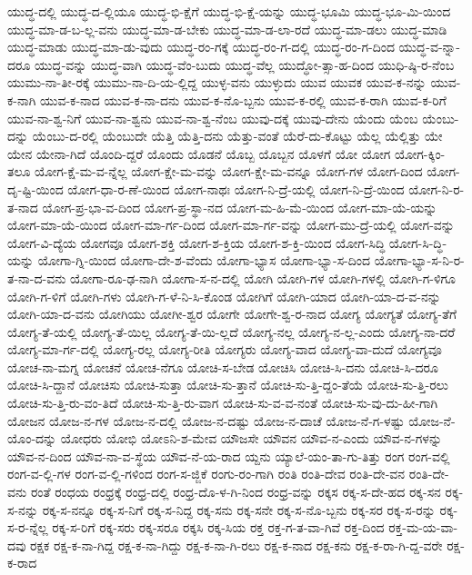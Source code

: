 {ಯುದ್ಧ-ದಲ್ಲಿ
ಯುದ್ಧ-ದ-ಲ್ಲಿಯೂ
ಯುದ್ಧ-ಭಿ-ಕ್ಷೆಗೆ
ಯುದ್ಧ-ಭಿ-ಕ್ಷೆ-ಯನ್ನು
ಯುದ್ಧ-ಭೂಮಿ
ಯುದ್ಧ-ಭೂ-ಮಿ-ಯಿಂದ
ಯುದ್ಧ-ಮಾ-ಡ-ಬ-ಲ್ಲ-ವನು
ಯುದ್ಧ-ಮಾ-ಡ-ಬೇಕು
ಯುದ್ಧ-ಮಾ-ಡ-ಲಾ-ರದೆ
ಯುದ್ಧ-ಮಾ-ಡಲು
ಯುದ್ಧ-ಮಾಡಿ
ಯುದ್ಧ-ಮಾಡು
ಯುದ್ಧ-ಮಾ-ಡು-ವುದು
ಯುದ್ಧ-ರಂ-ಗಕ್ಕೆ
ಯುದ್ಧ-ರಂ-ಗ-ದಲ್ಲಿ
ಯುದ್ಧ-ರಂ-ಗ-ದಿಂದ
ಯುದ್ಧ-ವ-ನ್ನಾ-ದರೂ
ಯುದ್ಧ-ವನ್ನು
ಯುದ್ಧ-ವಾಗಿ
ಯುದ್ಧ-ವೆಂ-ಬುದು
ಯುದ್ಧ-ವೆಲ್ಲ
ಯುದ್ಧೋ-ತ್ಸಾ-ಹ-ದಿಂದ
ಯುಧಿ-ಷ್ಠಿ-ರ-ನೆಂಬ
ಯುಮು-ನಾ-ತೀ-ರಕ್ಕೆ
ಯುಮು-ನಾ-ದಿ-ಯ-ಲ್ಲಿದ್ದ
ಯುಳ್ಳ-ವನು
ಯುಳ್ಳುದು
ಯುವ
ಯುವಕ
ಯುವ-ಕ-ನನ್ನು
ಯುವ-ಕ-ನಾಗಿ
ಯುವ-ಕ-ನಾದ
ಯುವ-ಕ-ನಾ-ದನು
ಯುವ-ಕ-ನೊ-ಬ್ಬನು
ಯುವ-ಕ-ರಲ್ಲಿ
ಯುವ-ಕ-ರಾಗಿ
ಯುವ-ಕ-ರಿಗೆ
ಯುವ-ನಾ-ಶ್ವ-ನಿಗೆ
ಯುವ-ನಾ-ಶ್ವನು
ಯುವ-ನಾ-ಶ್ವ-ನೆಂಬ
ಯುವು-ದಕ್ಕೆ
ಯುವು-ದೇನು
ಯೆಂದು
ಯೆಂಬ
ಯೆಂಬು-ದನ್ನು
ಯೆಂಬು-ದ-ರಲ್ಲಿ
ಯೆಂಬುದೇ
ಯೆತ್ತಿ
ಯೆತ್ತಿ-ದನು
ಯೆತ್ತು-ವಂತೆ
ಯೆರೆ-ದು-ಕೊಟ್ಟು
ಯೆಲ್ಲ
ಯೆಲ್ಲಿತ್ತು
ಯೇ
ಯೇನ
ಯೇನಾ-ಗಿದೆ
ಯೊಂದಿ-ದ್ದರೆ
ಯೊಂದು
ಯೊಡನೆ
ಯೊಬ್ಬ
ಯೊಬ್ಬನ
ಯೊಳಗೆ
ಯೋ
ಯೋಗ
ಯೋಗ-ಕ್ಕಿಂ-ತಲೂ
ಯೋಗ-ಕ್ಷೆ-ಮ-ವ-ನ್ನೆಲ್ಲ
ಯೋಗ-ಕ್ಷೇ-ಮ-ವನ್ನು
ಯೋಗ-ಕ್ಷೇ-ಮ-ವನ್ನೂ
ಯೋಗ-ಗಳ
ಯೋಗ-ದಿಂದ
ಯೋಗ-ದೃ-ಷ್ಟಿ-ಯಿಂದ
ಯೋಗ-ಧಾ-ರ-ಣೆ-ಯಿಂದ
ಯೋಗ-ನಾಥಃ
ಯೋಗ-ನಿ-ದ್ರೆ-ಯಲ್ಲಿ
ಯೋಗ-ನಿ-ದ್ರೆ-ಯಿಂದ
ಯೋಗ-ನಿ-ರ-ತ-ನಾದ
ಯೋಗ-ಪ್ರ-ಭಾ-ವ-ದಿಂದ
ಯೋಗ-ಪ್ರ-ಸ್ಥಾ-ನದ
ಯೋಗ-ಮ-ಹಿ-ಮೆ-ಯಿಂದ
ಯೋಗ-ಮಾ-ಯೆ-ಯನ್ನು
ಯೋಗ-ಮಾ-ಯೆ-ಯಿಂದ
ಯೋಗ-ಮಾ-ರ್ಗ-ದಿಂದ
ಯೋಗ-ಮಾ-ರ್ಗ-ವನ್ನು
ಯೋಗ-ಮು-ದ್ರೆ-ಯಲ್ಲಿ
ಯೋಗ-ವನ್ನು
ಯೋಗ-ವಿ-ದ್ಯೆಯ
ಯೋಗವೂ
ಯೋಗ-ಶಕ್ತಿ
ಯೋಗ-ಶ-ಕ್ತಿಯ
ಯೋಗ-ಶ-ಕ್ತಿ-ಯಿಂದ
ಯೋಗ-ಸಿದ್ಧಿ
ಯೋಗ-ಸಿ-ದ್ಧಿ-ಯನ್ನು
ಯೋಗಾ-ಗ್ನಿ-ಯಿಂದ
ಯೋಗಾ-ದೇ-ಶ-ವೆಂದು
ಯೋಗಾ-ಭ್ಯಾಸ
ಯೋಗಾ-ಭ್ಯಾ-ಸ-ದಿಂದ
ಯೋಗಾ-ಭ್ಯಾ-ಸ-ನಿ-ರ-ತ-ನಾ-ದ-ವನು
ಯೋಗಾ-ರೂ-ಢ-ನಾಗಿ
ಯೋಗಾ-ಸ-ನ-ದಲ್ಲಿ
ಯೋಗಿ
ಯೋಗಿ-ಗಳ
ಯೋಗಿ-ಗಳಲ್ಲಿ
ಯೋಗಿ-ಗ-ಳಿಗೂ
ಯೋಗಿ-ಗ-ಳಿಗೆ
ಯೋಗಿ-ಗಳು
ಯೋಗಿ-ಗ-ಳೆ-ನಿ-ಸಿ-ಕೊಂಡ
ಯೋಗಿಗೆ
ಯೋಗಿ-ಯಾದ
ಯೋಗಿ-ಯಾ-ದ-ವ-ನನ್ನು
ಯೋಗಿ-ಯಾ-ದ-ವನು
ಯೋಗಿಯು
ಯೋಗೀ-ಶ್ವರ
ಯೋಗೇ
ಯೋಗೇ-ಶ್ವ-ರ-ನಾದ
ಯೋಗ್ಯ
ಯೋಗ್ಯತೆ
ಯೋಗ್ಯ-ತೆಗೆ
ಯೋಗ್ಯ-ತೆ-ಯಲ್ಲಿ
ಯೋಗ್ಯ-ತೆ-ಯಿಲ್ಲ
ಯೋಗ್ಯ-ತೆ-ಯಿ-ಲ್ಲದೆ
ಯೋಗ್ಯ-ನಲ್ಲ
ಯೋಗ್ಯ-ನ-ಲ್ಲ-ಎಂದು
ಯೋಗ್ಯ-ನಾ-ದರೆ
ಯೋಗ್ಯ-ಮಾ-ರ್ಗ-ದಲ್ಲಿ
ಯೋಗ್ಯ-ರಲ್ಲ
ಯೋಗ್ಯ-ರೀತಿ
ಯೋಗ್ಯರು
ಯೋಗ್ಯ-ವಾದ
ಯೋಗ್ಯ-ವಾ-ದುದೆ
ಯೋಗ್ಯವೂ
ಯೋಚ-ನಾ-ಮಗ್ನ
ಯೋಚನೆ
ಯೋಚ-ನೆಗೂ
ಯೋಚಿ-ಸ-ಬೇಡ
ಯೋಚಿಸಿ
ಯೋಚಿ-ಸಿ-ದನು
ಯೋಚಿ-ಸಿ-ದರೂ
ಯೋಚಿ-ಸಿ-ದ್ದಾನೆ
ಯೋಚಿಸು
ಯೋಚಿ-ಸುತ್ತಾ
ಯೋಚಿ-ಸು-ತ್ತಾನೆ
ಯೋಚಿ-ಸು-ತ್ತಿ-ದ್ದಂ-ತೆಯೆ
ಯೋಚಿ-ಸು-ತ್ತಿ-ರಲು
ಯೋಚಿ-ಸು-ತ್ತಿ-ರು-ವಂ-ತಿದೆ
ಯೋಚಿ-ಸು-ತ್ತಿ-ರು-ವಾಗ
ಯೋಚಿ-ಸು-ವ-ವ-ನಂತೆ
ಯೋಚಿ-ಸು-ವು-ದು-ಹೀ-ಗಾಗಿ
ಯೋಜನ
ಯೋಜ-ನ-ಗಳ
ಯೋಜ-ನ-ದಲ್ಲಿ
ಯೋಜ-ನ-ದಷ್ಟು
ಯೋಜ-ನ-ದಾಚೆ
ಯೋಜ-ನೆ-ಗ-ಳಷ್ಟು
ಯೋಜ-ನೆ-ಯೊಂ-ದನ್ನು
ಯೋಧರು
ಯೋಭಿ
ಯೋಽನಿ-ಶ-ಮೇವ
ಯೌಜಸೇ
ಯೌವನ
ಯೌವ-ನ-ಎಂದು
ಯೌವ-ನ-ಗಳನ್ನು
ಯೌವ-ನ-ದಿಂದ
ಯೌವ-ನಾ-ವ-ಸ್ಥೆಯ
ಯೌವ-ನೆ-ಯ-ರಾದ
ಯ್ದನು
ಯ್ಯಾಲೆ-ಯಂ-ತಾ-ಗು-ತಿತ್ತು
ರಂಗ
ರಂಗ-ವಲ್ಲಿ
ರಂಗ-ವ-ಲ್ಲಿ-ಗಳ
ರಂಗ-ವ-ಲ್ಲಿ-ಗಳಿಂದ
ರಂಗ-ಸ-ಜ್ಜಿಕೆ
ರಂಗು-ರಂ-ಗಾಗಿ
ರಂತಿ
ರಂತಿ-ದೇವ
ರಂತಿ-ದೇ-ವನ
ರಂತಿ-ದೇ-ವನು
ರಂತೆ
ರಂಧಯ
ರಂಧ್ರಕ್ಕೆ
ರಂಧ್ರ-ದಲ್ಲಿ
ರಂಧ್ರ-ದೊ-ಳ-ಗಿ-ನಿಂದ
ರಂಧ್ರ-ವನ್ನು
ರಕ್ಕಸ
ರಕ್ಕ-ಸ-ದೇ-ಹದ
ರಕ್ಕ-ಸನ
ರಕ್ಕ-ಸ-ನನ್ನು
ರಕ್ಕ-ಸ-ನನ್ನೂ
ರಕ್ಕ-ಸ-ನಿಗೆ
ರಕ್ಕ-ಸ-ನಿದ್ದ
ರಕ್ಕ-ಸನು
ರಕ್ಕ-ಸನೇ
ರಕ್ಕ-ಸ-ನೊ-ಬ್ಬನು
ರಕ್ಕ-ಸರ
ರಕ್ಕ-ಸ-ರನ್ನು
ರಕ್ಕ-ಸ-ರ-ನ್ನೆಲ್ಲ
ರಕ್ಕ-ಸ-ರಿಗೆ
ರಕ್ಕ-ಸರು
ರಕ್ಕ-ಸರೂ
ರಕ್ಕಸಿ
ರಕ್ಕ-ಸಿಯ
ರಕ್ತ
ರಕ್ತ-ಗ-ತ-ವಾ-ಗಿವೆ
ರಕ್ತ-ದಿಂದ
ರಕ್ತ-ಮ-ಯ-ವಾ-ದವು
ರಕ್ಷಕ
ರಕ್ಷ-ಕ-ನಾ-ಗಿದ್ದ
ರಕ್ಷ-ಕ-ನಾ-ಗಿದ್ದು
ರಕ್ಷ-ಕ-ನಾ-ಗಿ-ರಲು
ರಕ್ಷ-ಕ-ನಾದ
ರಕ್ಷ-ಕನು
ರಕ್ಷ-ಕ-ರಾ-ಗಿ-ದ್ದ-ವರೇ
ರಕ್ಷ-ಕ-ರಾದ
}
